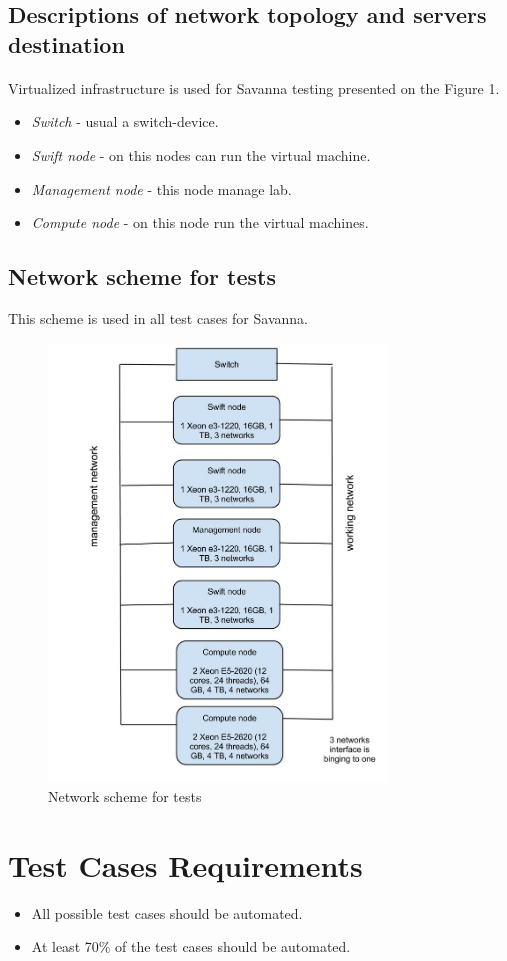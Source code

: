 \documentclass[a4paper,11pt]{article}
\begin{document}
\subsection{Descriptions of network topology and servers destination}
\paragraph{} Virtualized infrastructure is used for Savanna testing presented on the Figure 1.
\begin{itemize}
\item \textit{Switch} - usual a switch-device.
\item \textit{Swift node} - on this nodes can run the virtual machine.
\item \textit{Management node} - this node manage lab.
\item \textit{Compute node} - on this node run the virtual machines.
\end{itemize}

\subsection{Network scheme for tests}
This scheme is used in all test cases for Savanna.

\begin{figure}[hb]
\caption{Network scheme for tests}
 \begin{center}
  \includegraphics[width=9cm]{HadoopLabSchema.jpg}
 \end{center}
\label{fig:MainScheme}
\end{figure}



\section{Test Cases Requirements}

\begin{itemize}
\item All possible test cases should be automated.
\item At least 70\% of the test cases should be automated.
\end{itemize}
\end{document}
